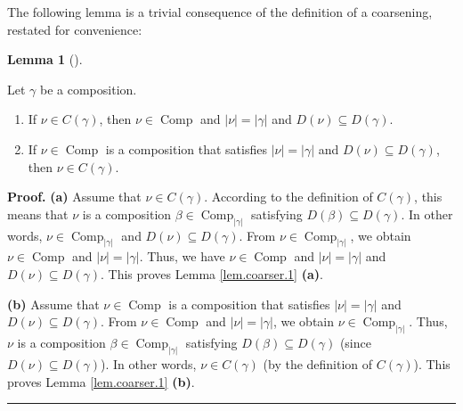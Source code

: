 \documentclass[numbers=enddot,12pt,final,onecolumn,notitlepage]{scrartcl}%
\theoremstyle{definition}
\newtheorem{lem}[theo]{Lemma}
\newenvironment{lemma}[1][]
{\begin{lem}[#1]\begin{leftbar}}
{\end{leftbar}\end{lem}}
\newenvironment{proof}[1][Proof]{\noindent\textbf{#1.} }{\ \rule{0.5em}{0.5em}}
\begin{document}
The following lemma is a trivial consequence of the definition of a
coarsening, restated for convenience:

\begin{lemma}
\label{lem.coarser.1}Let $\gamma$ be a composition.

\begin{enumerate}
\item[\textbf{(a)}] If $\nu\in C\left(  \gamma\right)  $, then $\nu
\in\operatorname*{Comp}$ and $\left\vert \nu\right\vert =\left\vert
\gamma\right\vert $ and $D\left(  \nu\right)  \subseteq D\left(
\gamma\right)  $.

\item[\textbf{(b)}] If $\nu\in\operatorname*{Comp}$ is a composition that
satisfies $\left\vert \nu\right\vert =\left\vert \gamma\right\vert $ and
$D\left(  \nu\right)  \subseteq D\left(  \gamma\right)  $, then $\nu\in
C\left(  \gamma\right)  $.
\end{enumerate}
\end{lemma}

\begin{proof}
\textbf{(a)} Assume that $\nu\in C\left(  \gamma\right)  $. According to the
definition of $C\left(  \gamma\right)  $, this means that $\nu$ is a
composition $\beta\in\operatorname*{Comp}\nolimits_{\left\vert \gamma
\right\vert }$ satisfying $D\left(  \beta\right)  \subseteq D\left(
\gamma\right)  $. In other words, $\nu\in\operatorname*{Comp}%
\nolimits_{\left\vert \gamma\right\vert }$ and $D\left(  \nu\right)  \subseteq
D\left(  \gamma\right)  $. From $\nu\in\operatorname*{Comp}%
\nolimits_{\left\vert \gamma\right\vert }$, we obtain $\nu\in
\operatorname*{Comp}$ and $\left\vert \nu\right\vert =\left\vert
\gamma\right\vert $. Thus, we have $\nu\in\operatorname*{Comp}$ and
$\left\vert \nu\right\vert =\left\vert \gamma\right\vert $ and $D\left(
\nu\right)  \subseteq D\left(  \gamma\right)  $. This proves Lemma
\ref{lem.coarser.1} \textbf{(a)}.

\textbf{(b)} Assume that $\nu\in\operatorname*{Comp}$ is a composition that
satisfies $\left\vert \nu\right\vert =\left\vert \gamma\right\vert $ and
$D\left(  \nu\right)  \subseteq D\left(  \gamma\right)  $. From $\nu
\in\operatorname*{Comp}$ and $\left\vert \nu\right\vert =\left\vert
\gamma\right\vert $, we obtain $\nu\in\operatorname*{Comp}%
\nolimits_{\left\vert \gamma\right\vert }$. Thus, $\nu$ is a composition
$\beta\in\operatorname*{Comp}\nolimits_{\left\vert \gamma\right\vert }$
satisfying $D\left(  \beta\right)  \subseteq D\left(  \gamma\right)  $ (since
$D\left(  \nu\right)  \subseteq D\left(  \gamma\right)  $). In other words,
$\nu\in C\left(  \gamma\right)  $ (by the definition of $C\left(
\gamma\right)  $). This proves Lemma \ref{lem.coarser.1} \textbf{(b)}.
\end{proof}
\end{document}
